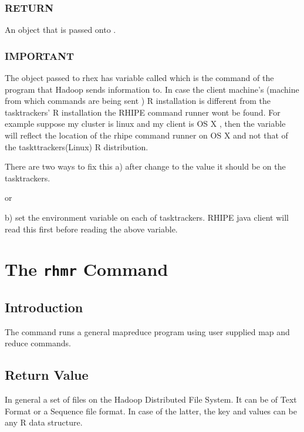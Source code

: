 \documentclass[letterpaper,10pt,english]{manual}
\begin{document}
\subsection{RETURN}

An object that is passed onto .


\subsection{IMPORTANT}

The object passed to rhex has variable called  which is the
command of the program that Hadoop sends information to. In case the client
machine's (machine from which commands are being sent ) R installation is different from the
tasktrackers' R installation the RHIPE command runner wont be found. For example
suppose my cluster is linux and my client is OS X , then the 
variable will reflect the location of the rhipe command runner on OS X and not
that of the taskttrackers(Linux) R distribution.

There are two ways to fix this
a) after  change  to the
value it should be on the tasktrackers.

or

b) set the environment variable  on each of tasktrackers. RHIPE
java client will read this first before reading the above variable.

\resetcurrentobjects
\hypertarget{--doc-rhmr}{}

\chapter{The \texttt{rhmr} Command}


\section{Introduction}

The  command runs a general mapreduce program using user supplied map
and reduce commands.


\section{Return Value}

In general a set of files on the Hadoop Distributed File System. It can be of
Text Format or a Sequence file format. In case of the latter, the key and values
can be any R data structure.
\end{document}

